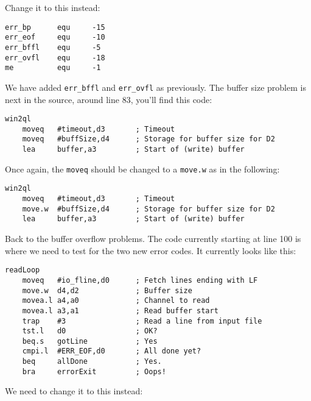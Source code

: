 Change it to this instead:

\begin{lstlisting}[showstringspaces=false,tabsize=4]
err_bp      equ     -15
err_eof     equ     -10
err_bffl    equ     -5
err_ovfl    equ     -18
me          equ     -1
\end{lstlisting}

We have added \texttt{err\_bffl} and \texttt{err\_ovfl} as previously.
The buffer size problem is next in the source, around line 83, you'll
find this code:

\begin{lstlisting}[showstringspaces=false,tabsize=4]
win2ql
    moveq   #timeout,d3       ; Timeout
    moveq   #buffSize,d4      ; Storage for buffer size for D2
    lea     buffer,a3         ; Start of (write) buffer
\end{lstlisting}

Once again, the \texttt{moveq} should be changed to a \texttt{move.w}
as in the following:

\begin{lstlisting}[showstringspaces=false,tabsize=4]
win2ql
    moveq   #timeout,d3       ; Timeout
    move.w  #buffSize,d4      ; Storage for buffer size for D2
    lea     buffer,a3         ; Start of (write) buffer
\end{lstlisting}

Back to the buffer overflow problems. The code currently starting
at line 100 is where we need to test for the two new error codes.
It currently looks like this:

\begin{lstlisting}[showstringspaces=false,tabsize=4]
readLoop
    moveq   #io_fline,d0      ; Fetch lines ending with LF
    move.w  d4,d2             ; Buffer size
    movea.l a4,a0             ; Channel to read
    movea.l a3,a1             ; Read buffer start
    trap    #3                ; Read a line from input file
    tst.l   d0                ; OK?
    beq.s   gotLine           ; Yes
    cmpi.l  #ERR_EOF,d0       ; All done yet?
    beq     allDone           ; Yes.
    bra     errorExit         ; Oops!
\end{lstlisting}

We need to change it to this instead:

